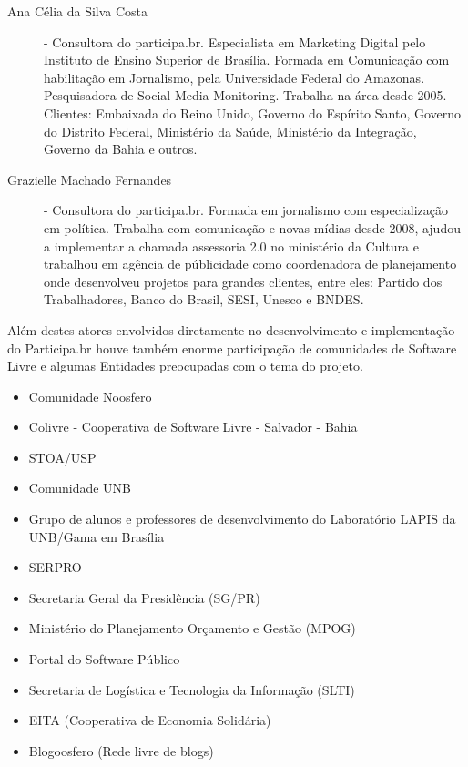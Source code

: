 \documentclass{article}
\begin{document}
\begin{description}
  \item [Ana Célia da Silva Costa]
  - Consultora do participa.br. Especialista em Marketing Digital pelo Instituto de Ensino Superior de Brasília. Formada em Comunicação com habilitação em Jornalismo, pela Universidade Federal do Amazonas. Pesquisadora de Social Media Monitoring. Trabalha na área desde 2005. Clientes: Embaixada do Reino Unido, Governo do Espírito Santo, Governo do Distrito Federal, Ministério da Saúde, Ministério da Integração, Governo da Bahia e outros. 

  \item [Grazielle Machado Fernandes]
  - Consultora do participa.br. Formada em jornalismo com especialização em política. Trabalha com comunicação e novas mídias desde 2008, ajudou a implementar a chamada assessoria 2.0 no ministério da Cultura e trabalhou em agência de públicidade como coordenadora de planejamento onde desenvolveu projetos para grandes clientes, entre eles: Partido dos Trabalhadores, Banco do Brasil, SESI, Unesco e BNDES. 

\end{description}

Além destes atores envolvidos diretamente no desenvolvimento e implementação do
Participa.br houve também enorme participação de comunidades de Software
Livre e algumas Entidades preocupadas com o tema do projeto.

\begin{itemize}

  \item Comunidade Noosfero
  \item Colivre - Cooperativa de Software Livre - Salvador - Bahia
  \item STOA/USP
  \item Comunidade UNB
  \item Grupo de alunos e professores de desenvolvimento do Laboratório LAPIS da UNB/Gama em Brasília
  \item SERPRO
  \item Secretaria Geral da Presidência (SG/PR)
  \item Ministério do Planejamento Orçamento e Gestão (MPOG)
  \item Portal do Software Público
  \item Secretaria de Logística e Tecnologia da Informação (SLTI)
  \item EITA (Cooperativa de Economia Solidária)
  \item Blogoosfero (Rede livre de blogs)

\end{itemize}
\end{document}
